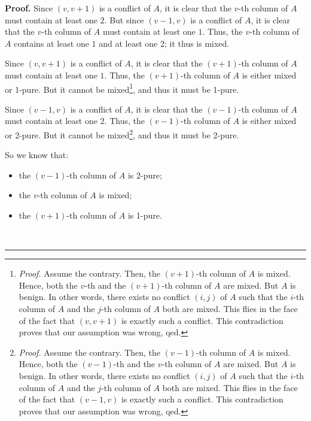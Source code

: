 \documentclass[numbers=enddot,12pt,final,onecolumn,notitlepage]{scrartcl}%
\theoremstyle{definition}
\newenvironment{proof}[1][Proof]{\noindent\textbf{#1.} }{\ \rule{0.5em}{0.5em}}
\newenvironment{verlong}{}{}
\begin{document}
\begin{verlong}
\begin{proof}
Since $\left(  v,v+1\right)  $ is a conflict of $A$, it is clear that the
$v$-th column of $A$ must contain at least one $2$. But since $\left(
v-1,v\right)  $ is a conflict of $A$, it is clear that the $v$-th column of
$A$ must contain at least one $1$. Thus, the $v$-th column of $A$ contains at
least one $1$ and at least one $2$; it thus is mixed.

Since $\left(  v,v+1\right)  $ is a conflict of $A$, it is clear that the
$\left(  v+1\right)  $-th column of $A$ must contain at least one $1$. Thus,
the $\left(  v+1\right)  $-th column of $A$ is either mixed or 1-pure. But it
cannot be mixed\footnote{\textit{Proof.} Assume the contrary. Then, the
$\left(  v+1\right)  $-th column of $A$ is mixed. Hence, both the $v$-th and
the $\left(  v+1\right)  $-th column of $A$ are mixed. But $A$ is benign. In
other words, there exists no conflict $\left(  i,j\right)  $ of $A$ such that
the $i$-th column of $A$ and the $j$-th column of $A$ both are mixed. This
flies in the face of the fact that $\left(  v,v+1\right)  $ is exactly such a
conflict. This contradiction proves that our assumption was wrong, qed.}, and
thus it must be 1-pure.

Since $\left(  v-1,v\right)  $ is a conflict of $A$, it is clear that the
$\left(  v-1\right)  $-th column of $A$ must contain at least one $2$. Thus,
the $\left(  v-1\right)  $-th column of $A$ is either mixed or 2-pure. But it
cannot be mixed\footnote{\textit{Proof.} Assume the contrary. Then, the
$\left(  v-1\right)  $-th column of $A$ is mixed. Hence, both the $\left(
v-1\right)  $-th and the $v$-th column of $A$ are mixed. But $A$ is benign. In
other words, there exists no conflict $\left(  i,j\right)  $ of $A$ such that
the $i$-th column of $A$ and the $j$-th column of $A$ both are mixed. This
flies in the face of the fact that $\left(  v-1,v\right)  $ is exactly such a
conflict. This contradiction proves that our assumption was wrong, qed.}, and
thus it must be 2-pure.

So we know that:

\begin{itemize}
\item the $\left(  v-1\right)  $-th column of $A$ is 2-pure;

\item the $v$-th column of $A$ is mixed;

\item the $\left(  v+1\right)  $-th column of $A$ is 1-pure.
\end{itemize}


\end{proof}
\end{verlong}
\end{document}
